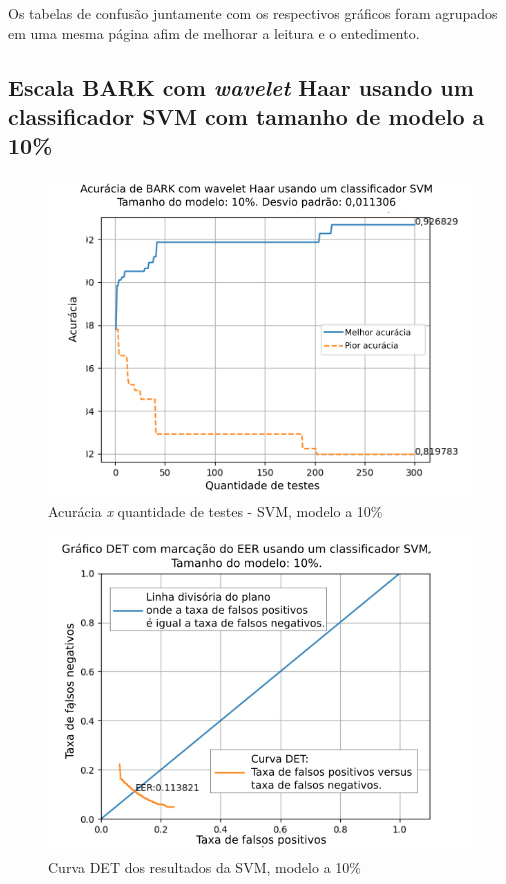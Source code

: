 		
		
		\par Os tabelas de confusão juntamente com os respectivos gráficos foram agrupados em uma mesma página afim de melhorar a leitura e o entedimento.
		
		\newpage
		\subsection{Escala BARK com \textit{wavelet} Haar usando um classificador SVM com tamanho de modelo a 10\%}
			
		
			\begin{figure}[H]
				\centering
				\includegraphics[width=.6\linewidth]{images/results/confusionMatrices/classifier_SVM_10.png}
				\caption{Acurácia \textit{x} quantidade de testes - SVM, modelo a 10\%}
				\label{fig:classifiersvm10}
			\end{figure}
		
			\begin{figure}[H]
				\centering
				\includegraphics[width=.6\linewidth]{images/results/det/DET_SVM_10}
				\caption{Curva DET dos resultados da SVM, modelo a 10\%}
				\label{fig:detsvm10}
			\end{figure}


